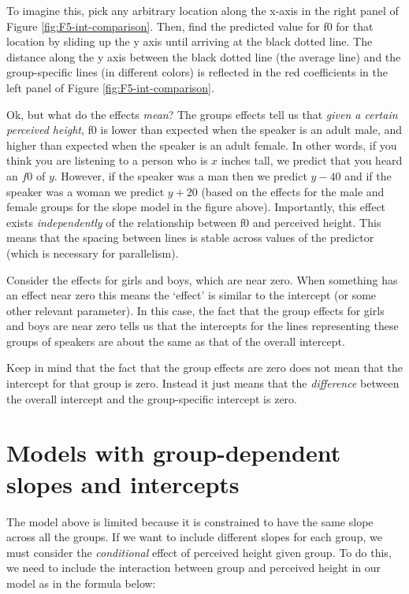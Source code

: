 \documentclass[
]{book}
\begin{document}
To imagine this, pick any arbitrary location along the x-axis in the right panel of Figure \ref{fig:F5-int-comparison}. Then, find the predicted value for f0 for that location by sliding up the y axis until arriving at the black dotted line. The distance along the y axis between the black dotted line (the average line) and the group-specific lines (in different colors) is reflected in the red coefficients in the left panel of Figure \ref{fig:F5-int-comparison}.

Ok, but what do the effects \emph{mean}? The groups effects tell us that \emph{given a certain perceived height}, f0 is lower than expected when the speaker is an adult male, and higher than expected when the speaker is an adult female. In other words, if you think you are listening to a person who is \(x\) inches tall, we predict that you heard an \(f0\) of \(y\). However, if the speaker was a man then we predict \(y-40\) and if the speaker was a woman we predict \(y+20\) (based on the effects for the male and female groups for the slope model in the figure above). Importantly, this effect exists \emph{independently} of the relationship between f0 and perceived height. This means that the spacing between lines is stable across values of the predictor (which is necessary for parallelism).

Consider the effects for girls and boys, which are near zero. When something has an effect near zero this means the `effect' is similar to the intercept (or some other relevant parameter). In this case, the fact that the group effects for girls and boys are near zero tells us that the intercepts for the lines representing these groups of speakers are about the same as that of the overall intercept.

Keep in mind that the fact that the group effects are zero does not mean that the intercept for that group is zero. Instead it just means that the \emph{difference} between the overall intercept and the group-specific intercept is zero.

\hypertarget{models-with-group-dependent-slopes-and-intercepts}{%
\section{Models with group-dependent slopes and intercepts}\label{models-with-group-dependent-slopes-and-intercepts}}

The model above is limited because it is constrained to have the same slope across all the groups. If we want to include different slopes for each group, we must consider the \emph{conditional} effect of perceived height given group. To do this, we need to include the interaction between group and perceived height in our model as in the formula below:
\end{document}
